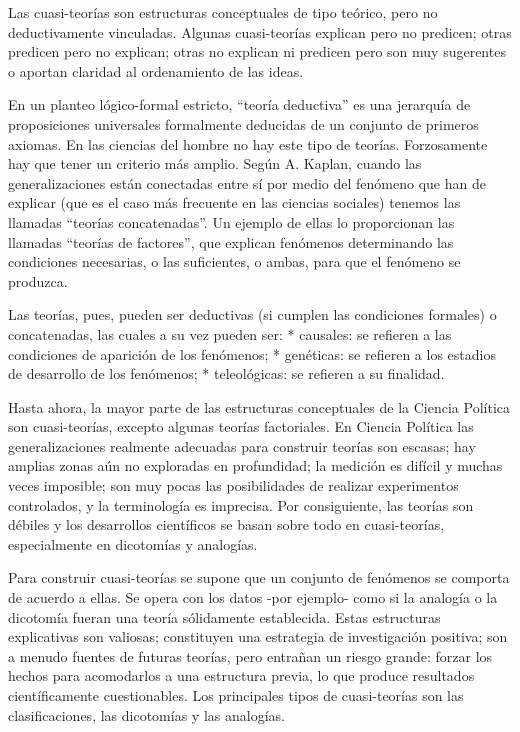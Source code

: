 \documentclass[
]{book}
\begin{document}
Las cuasi-teorías son estructuras conceptuales de tipo teórico, pero no deductivamente vinculadas. Algunas cuasi-teorías explican pero no predicen; otras predicen pero no explican; otras no explican ni predicen pero son muy sugerentes o aportan claridad al ordenamiento de las ideas.

En un planteo lógico-formal estricto, ``teoría deductiva'' es una jerarquía de proposiciones universales formalmente deducidas de un conjunto de primeros axiomas. En las ciencias del hombre no hay este tipo de teorías. Forzosamente hay que tener un criterio más amplio. Según A. Kaplan, cuando las generalizaciones están conectadas entre sí por medio del fenómeno que han de explicar (que es el caso más frecuente en las ciencias sociales) tenemos las llamadas ``teorías concatenadas''. Un ejemplo de ellas lo proporcionan las llamadas ``teorías de factores'', que explican fenómenos determinando las condiciones necesarias, o las suficientes, o ambas, para que el fenómeno se produzca.

Las teorías, pues, pueden ser deductivas (si cumplen las condiciones formales) o concatenadas, las cuales a su vez pueden ser: * causales: se refieren a las condiciones de aparición de los fenómenos; * genéticas: se refieren a los estadios de desarrollo de los fenómenos; * teleológicas: se refieren a su finalidad.

Hasta ahora, la mayor parte de las estructuras conceptuales de la Ciencia Política son cuasi-teorías, excepto algunas teorías factoriales. En Ciencia Política las generalizaciones realmente adecuadas para construir teorías son escasas; hay amplias zonas aún no exploradas en profundidad; la medición es difícil y muchas veces imposible; son muy pocas las posibilidades de realizar experimentos controlados, y la terminología es imprecisa. Por consiguiente, las teorías son débiles y los desarrollos científicos se basan sobre todo en cuasi-teorías, especialmente en dicotomías y analogías.

Para construir cuasi-teorías se supone que un conjunto de fenómenos se comporta de acuerdo a ellas. Se opera con los datos -por ejemplo- como si la analogía o la dicotomía fueran una teoría sólidamente establecida. Estas estructuras explicativas son valiosas; constituyen una estrategia de investigación positiva; son a menudo fuentes de futuras teorías, pero entrañan un riesgo grande: forzar los hechos para acomodarlos a una estructura previa, lo que produce resultados científicamente cuestionables. Los principales tipos de cuasi-teorías son las clasificaciones, las dicotomías y las analogías.
\end{document}
